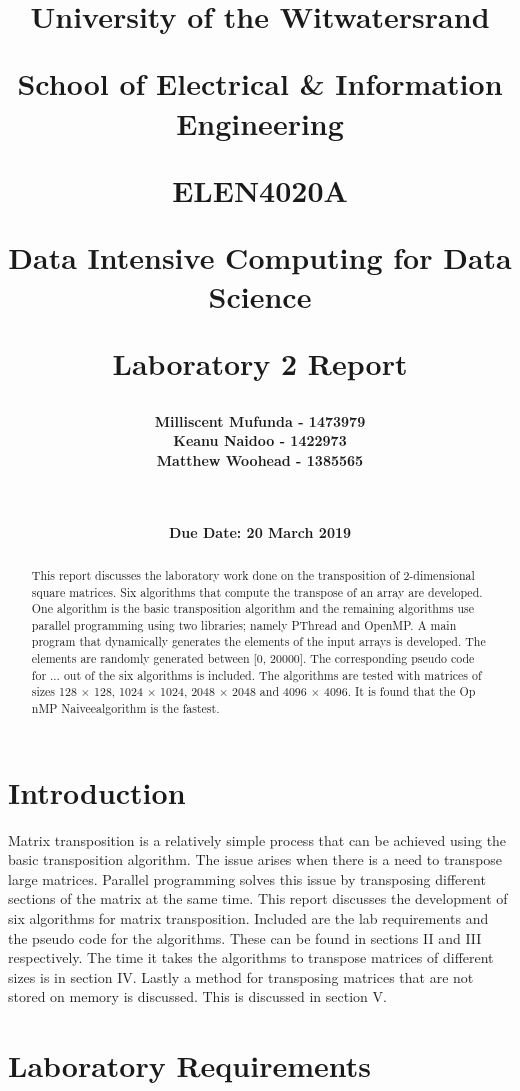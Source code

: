 \documentclass[twocolumn, 11pt]{IEEEtran}
\title{ \Large \bf University of the Witwatersrand \centerline{School of Electrical \& Information Engineering} \newline \newline \newline \newline \newline \newline \LARGE \bf ELEN4020A  \centerline{Data Intensive Computing for Data Science} \newline \centerline{Laboratory 2 Report} \newline}
\date{\LARGE \bf Due Date: 20 March 2019}
\author{ \LARGE \bf Milliscent Mufunda - 1473979 \\ \LARGE \bf Keanu Naidoo - 1422973 \\ \LARGE \bf Matthew Woohead -  1385565\\ \\ \\}
\begin{document}
\begin{titlingpage}

\maketitle

\end{titlingpage}

\setcounter{page}{1}

\begin{abstract}
    
This report discusses the laboratory work done on the transposition of 2-dimensional square matrices. Six algorithms that compute the transpose of an array are developed. One algorithm is the basic transposition algorithm and the remaining algorithms use parallel programming using two libraries; namely PThread and OpenMP. A main program that dynamically generates the elements of the input arrays is developed. The elements are randomly generated between [0, 20000]. The corresponding pseudo code for ... out of the six algorithms is included. The algorithms are tested with matrices of sizes 128 $\times$ 128, 1024 $\times$ 1024, 2048 $\times$ 2048 and 4096 $\times$ 4096. It is found that the Op nMP Naiveealgorithm is the fastest.
    
\end{abstract}

\section{Introduction}

Matrix transposition is a relatively simple process that can be achieved using the basic transposition algorithm. The issue arises when there is a need to transpose large matrices. Parallel programming solves this issue by transposing different sections of the matrix at the same time. This report discusses the development of six algorithms for matrix transposition. Included are the lab requirements and the pseudo code for the algorithms. These can be found in sections II and III respectively. The time it takes the algorithms to transpose matrices of different sizes is in section IV. Lastly a method for transposing matrices that are not stored on memory is discussed. This is discussed in section V. 


\section{Laboratory Requirements}
\end{document}
